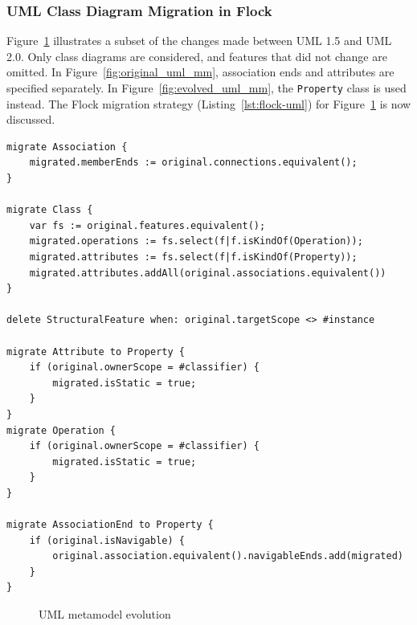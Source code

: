 \subsubsection{UML Class Diagram Migration in Flock}
Figure~\ref{fig:uml_mms} illustrates a subset of the changes made between UML 1.5 and UML 2.0. Only class diagrams are considered, and features that did not change are omitted. In Figure~\ref{fig:original_uml_mm}, association ends and attributes are specified separately. In Figure~\ref{fig:evolved_uml_mm}, the \texttt{Pr\-op\-er\-ty} class is used instead. The Flock migration strategy (Listing~\ref{lst:flock-uml}) for Figure~\ref{fig:uml_mms} is now discussed.

\begin{lstlisting}[caption=UML model migration in Flock, label=lst:flock-uml, language=Flock]
migrate Association {
	migrated.memberEnds := original.connections.equivalent();
}

migrate Class {
	var fs := original.features.equivalent();
	migrated.operations := fs.select(f|f.isKindOf(Operation));
	migrated.attributes := fs.select(f|f.isKindOf(Property));
	migrated.attributes.addAll(original.associations.equivalent())
}

delete StructuralFeature when: original.targetScope <> #instance

migrate Attribute to Property {
	if (original.ownerScope = #classifier) {
		migrated.isStatic = true;		
	}
}
migrate Operation {
	if (original.ownerScope = #classifier) {
		migrated.isStatic = true;
	}
}

migrate AssociationEnd to Property {
	if (original.isNavigable) {
		original.association.equivalent().navigableEnds.add(migrated)
	}
}
\end{lstlisting}

\begin{landscape}	
\begin{figure}
	\centering
	\caption{UML metamodel evolution}
\label{fig:uml_mms}
\end{figure}
\end{landscape}	

